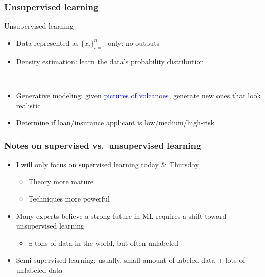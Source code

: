 \begin{frame}[t]
    \frametitle{Unsupervised learning}
    \begin{block}{Unsupervised learning}
        \begin{itemize}
            \item Data represented as $\{x_i\}_{i=1}^n$ only: no outputs
            \item \alert{Density estimation}: learn the data's probability distribution
        \end{itemize}
    \end{block}

     \\[1ex]

    \begin{itemize}
        \item<4-> Generative modeling: given \textcolor<5->{blue}{pictures of volcanoes}, generate \textcolor<5->{Green4}{new ones that look realistic}
        \item<6-> Determine if loan/insurance applicant is low/medium/high-risk
    \end{itemize}

    \hfill
\end{frame}

\begin{frame}
    \frametitle{Notes on supervised vs.\ unsupervised learning}

    \begin{itemize}
        \item I will only focus on supervised learning today \& Thursday
        \begin{itemize}
            \item Theory more mature
            \item Techniques more powerful
        \end{itemize}
        \item Many experts believe a strong future in ML requires a shift toward unsupervised learning
        \begin{itemize}
            \item $\exists$ tons of data in the world, but often unlabeled
        \end{itemize}
        \item Semi-supervised learning: usually, small amount of labeled data + lots of unlabeled data
    \end{itemize}
\end{frame}

